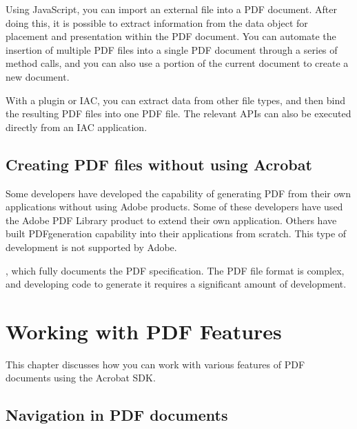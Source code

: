 \documentclass[letterpaper,12pt,english,openany,oneside]{sphinxmanual}
\begin{document}
Using JavaScript, you can import an external file into a PDF document. After doing this, it is possible to extract information from the data object for placement and presentation within the PDF document. You can automate the insertion of multiple PDF files into a single PDF document through a series of method calls, and you can also use a portion of the current document to create a new document.

With a plug\sphinxhyphen{}in or IAC, you can extract data from other file types, and then bind the resulting PDF files into one PDF file. The relevant APIs can also be executed directly from an IAC application.


\section{Creating PDF files without using Acrobat}
\label{\detokenize{Overview_PDFCreation:creating-pdf-files-without-using-acrobat}}
Some developers have developed the capability of generating PDF from their own applications without using Adobe products. Some of these developers have used the Adobe PDF Library product to extend their own application. Others have built PDF\sphinxhyphen{}generation capability into their applications from scratch. This type of development is not supported by Adobe.

  , which fully documents the PDF specification. The PDF file format is complex, and developing code to generate it requires a significant amount of development.


\chapter{Working with PDF Features}
\label{\detokenize{Overview_Editing:working-with-pdf-features}}\label{\detokenize{Overview_Editing::doc}}
This chapter discusses how you can work with various features of PDF documents using the Acrobat SDK.




\section{Navigation in PDF documents}
\label{\detokenize{Overview_Editing:navigation-in-pdf-documents}}
\end{document}
